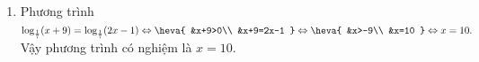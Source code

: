 \begin{bt}
{\begin{enumerate}
			\[
			\Leftrightarrow 
			\heva{
				&x>\dfrac{5}{3}\\
				&3x-5=2x+1
			} \Leftrightarrow
			\heva{
				&x>\dfrac{5}{3}\\
				&x=6
			} \Leftrightarrow x=6.\]
			Vậy phương trình có nghiệm là $x=6$.
			\item  Phương trình $\log_{\frac{1}{7}}(x+9)=\log_{\frac{1}{7}} (2x-1)
			\Leftrightarrow 
			\heva{
				&x+9>0\\
				&x+9=2x-1
			} \Leftrightarrow
			\heva{
				&x>-9\\
				&x=10
			} \Leftrightarrow x=10.
			$\\
			Vậy phương trình có nghiệm là $x=10$.
		\end{enumerate}
	}
\end{bt}

